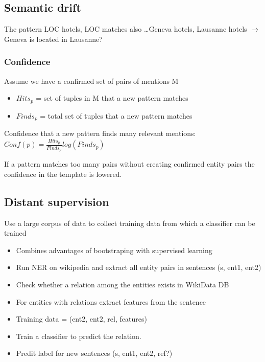 \subsection{Semantic drift}
The pattern LOC hotels, LOC matches also \ldots Geneva hotels,
Lausanne hotels $ \rightarrow $ Geneva is located in Lausanne?

\subsubsection{Confidence}
Assume we have a confirmed set of pairs of mentions M
\begin{itemize}
\item $ Hits_p $ = set of tuples in M that a new pattern matches
\item $ Finds_p $ = total set of tuples that a new pattern matches
\end{itemize}

Confidence that a new pattern finds many relevant mentions: \\
$ Conf(p) = \frac{Hits_p}{Finds_p} log(Finds_p) $

If a pattern matches too many pairs without creating confirmed entity
pairs the confidence in the template is lowered.

\subsection{Distant supervision}

Use a large corpus of data to collect training data from which a
classifier can be trained
\begin{itemize}
\item Combines advantages of bootstraping with supervised learning
\end{itemize}

\begin{itemize}
\item Run NER on wikipedia and extract all entity pairs in sentences
  (s, ent1, ent2)
\item Check whether a relation among the entities exists in WikiData
  DB
\item For entities with relations extract features from the sentence
\item Training data = (ent2, ent2, rel, features)
\item Train a classifier to predict the relation.
\item Predit label for new sentences (s, ent1, ent2, ref?)
\end{itemize}

